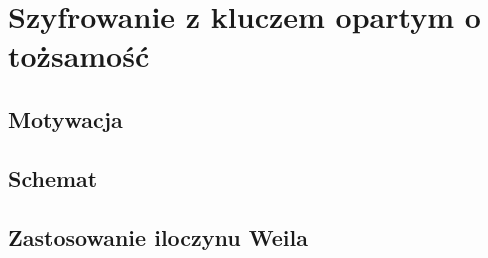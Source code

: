 \section{Szyfrowanie z kluczem opartym o tożsamość}

\subsection*{Motywacja}


\subsection*{Schemat}


\subsection*{Zastosowanie iloczynu Weila}

